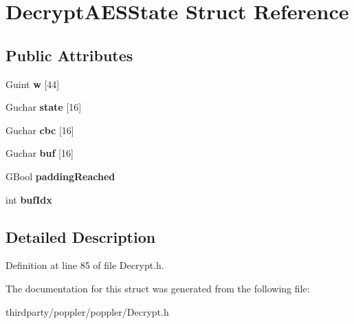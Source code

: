 \hypertarget{struct_decrypt_a_e_s_state}{}\section{Decrypt\+A\+E\+S\+State Struct Reference}
\label{struct_decrypt_a_e_s_state}
\subsection*{Public Attributes}
\begin{DoxyCompactItemize}
\item 
\mbox{\label{struct_decrypt_a_e_s_state_a6bf14e23ef174dea134584e23eff49f2}} 
Guint {\bfseries w} \mbox{[}44\mbox{]}
\item 
\mbox{\label{struct_decrypt_a_e_s_state_a269d15726bd592deeb71a55f0f211272}} 
Guchar {\bfseries state} \mbox{[}16\mbox{]}
\item 
\mbox{\label{struct_decrypt_a_e_s_state_a3670a396c1d2c46d1808de19710e902b}} 
Guchar {\bfseries cbc} \mbox{[}16\mbox{]}
\item 
\mbox{\label{struct_decrypt_a_e_s_state_aba7a059eda61f637eae3df0d049dfe21}} 
Guchar {\bfseries buf} \mbox{[}16\mbox{]}
\item 
\mbox{\label{struct_decrypt_a_e_s_state_af3d70eb5708c8798ae2d52fc3d8a035e}} 
G\+Bool {\bfseries padding\+Reached}
\item 
\mbox{\label{struct_decrypt_a_e_s_state_ad4dec776047455c1f8c336024c865a05}} 
int {\bfseries buf\+Idx}
\end{DoxyCompactItemize}


\subsection{Detailed Description}


Definition at line 85 of file Decrypt.\+h.



The documentation for this struct was generated from the following file\+:\begin{DoxyCompactItemize}
\item 
thirdparty/poppler/poppler/Decrypt.\+h\end{DoxyCompactItemize}
